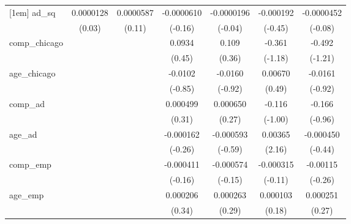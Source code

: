 {\begin{tabular}{l*{6}{c}}
[1em]
ad\_sq       &   0.0000128         &   0.0000587         &  -0.0000610         &  -0.0000196         &   -0.000192         &  -0.0000452         \\
            &      (0.03)         &      (0.11)         &     (-0.16)         &     (-0.04)         &     (-0.45)         &     (-0.08)         \\
[1em]
comp\_chicago&                     &                     &      0.0934         &       0.109         &      -0.361         &      -0.492         \\
            &                     &                     &      (0.45)         &      (0.36)         &     (-1.18)         &     (-1.21)         \\
[1em]
age\_chicago &                     &                     &     -0.0102         &     -0.0160         &     0.00670         &     -0.0161         \\
            &                     &                     &     (-0.85)         &     (-0.92)         &      (0.49)         &     (-0.92)         \\
[1em]
comp\_ad     &                     &                     &    0.000499         &    0.000650         &      -0.116         &      -0.166         \\
            &                     &                     &      (0.31)         &      (0.27)         &     (-1.00)         &     (-0.96)         \\
[1em]
age\_ad      &                     &                     &   -0.000162         &   -0.000593         &     0.00365\sym{*}  &   -0.000450         \\
            &                     &                     &     (-0.26)         &     (-0.59)         &      (2.16)         &     (-0.44)         \\
[1em]
comp\_emp    &                     &                     &   -0.000411         &   -0.000574         &   -0.000315         &    -0.00115         \\
            &                     &                     &     (-0.16)         &     (-0.15)         &     (-0.11)         &     (-0.26)         \\
[1em]
age\_emp     &                     &                     &    0.000206         &    0.000263         &    0.000103         &    0.000251         \\
            &                     &                     &      (0.34)         &      (0.29)         &      (0.18)         &      (0.27)         \\

\end{tabular}}
